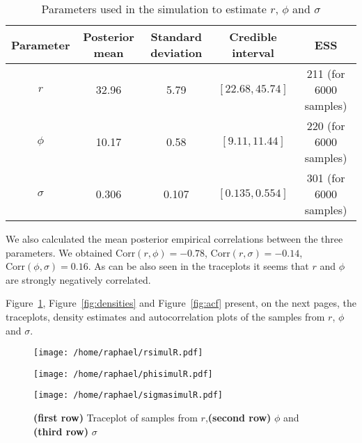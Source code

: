 \documentclass{article}
\begin{document}
	\begin{table}[htb]
		\centering
		\vspace{5mm}
		\begin{tabular}{c|c|c|c|c}
			Parameter & Posterior mean & Standard deviation& Credible interval &  ESS \\ \hline
			$r$ & 32.96 & 5.79 & $[22.68, 45.74]$ & 211 (for 6000 samples)\\ \hline
			$\phi$ & 10.17 & 0.58 & $[9.11, 11.44]$ & 220 (for 6000 samples)\\ \hline
			$\sigma$ & 0.306 &  0.107 & $[0.135, 0.554]$& 301 (for 6000 samples) \\ \hline
		\end{tabular}
		\caption{Parameters used in the simulation to estimate $r$, $\phi$ and $\sigma$}
		\label{table:summary}
		\vspace{5mm}
	\end{table}

We also calculated the mean posterior empirical correlations between the three parameters. We obtained $\mathrm{Corr}(r, \phi) = -0.78$, $\mathrm{Corr}(r, \sigma) = -0.14$,  $\mathrm{Corr}(\phi, \sigma) = 0.16$. As can be also seen in the traceplots it seems that $r$ and $\phi$ are strongly negatively correlated.


Figure~\ref{fig:samples}, Figure~\ref{fig:densities} and Figure~\ref{fig:acf} present, on the next pages, the traceplots, density estimates and autocorrelation plots of the samples from $r$, $\phi$ and $\sigma$.

	\begin{figure}[htb]
		\centering
		\begin{minipage}{0.6\textwidth}
			\centering
			\texttt{[image: /home/raphael/rsimulR.pdf]}
		\end{minipage}
		\begin{minipage}{0.6\textwidth}
			\centering
			\texttt{[image: /home/raphael/phisimulR.pdf]}
		\end{minipage}
		\begin{minipage}{0.6\textwidth}
			\centering
			\texttt{[image: /home/raphael/sigmasimulR.pdf]}
		\end{minipage}
		\caption{\textbf{(first row)} Traceplot of samples from $r$,\textbf{(second row)} $\phi$ and \textbf{(third row)} $\sigma$}
		\label{fig:samples}
	\end{figure}
	
\end{document}
